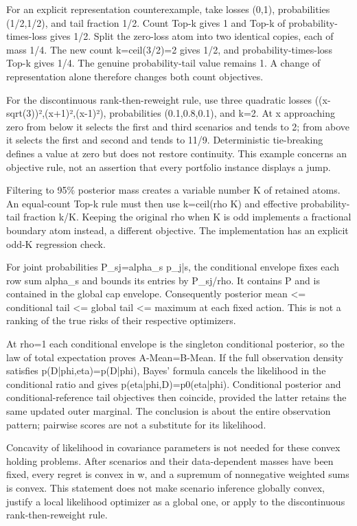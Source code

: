 \documentclass[10pt]{article}
\begin{document}
For an explicit representation counterexample, take losses (0,1), probabilities (1/2,1/2), and tail fraction 1/2. Count Top-k gives 1 and Top-k of probability-times-loss gives 1/2. Split the zero-loss atom into two identical copies, each of mass 1/4. The new count k=ceil(3/2)=2 gives 1/2, and probability-times-loss Top-k gives 1/4. The genuine probability-tail value remains 1. A change of representation alone therefore changes both count objectives.

For the discontinuous rank-then-reweight rule, use three quadratic losses ((x-sqrt(3))²,(x+1)²,(x-1)²), probabilities (0.1,0.8,0.1), and k=2. At x approaching zero from below it selects the first and third scenarios and tends to 2; from above it selects the first and second and tends to 11/9. Deterministic tie-breaking defines a value at zero but does not restore continuity. This example concerns an objective rule, not an assertion that every portfolio instance displays a jump.

Filtering to 95\% posterior mass creates a variable number K of retained atoms. An equal-count Top-k rule must then use k=ceil(rho K) and effective probability-tail fraction k/K. Keeping the original rho when K is odd implements a fractional boundary atom instead, a different objective. The implementation has an explicit odd-K regression check.

For joint probabilities P\_sj=alpha\_s p\_j|s, the conditional envelope fixes each row sum alpha\_s and bounds its entries by P\_sj/rho. It contains P and is contained in the global cap envelope. Consequently posterior mean <= conditional tail <= global tail <= maximum at each fixed action. This is not a ranking of the true risks of their respective optimizers.

At rho=1 each conditional envelope is the singleton conditional posterior, so the law of total expectation proves A-Mean=B-Mean. If the full observation density satisfies p(D|phi,eta)=p(D|phi), Bayes' formula cancels the likelihood in the conditional ratio and gives p(eta|phi,D)=p0(eta|phi). Conditional posterior and conditional-reference tail objectives then coincide, provided the latter retains the same updated outer marginal. The conclusion is about the entire observation pattern; pairwise scores are not a substitute for its likelihood.

Concavity of likelihood in covariance parameters is not needed for these convex holding problems. After scenarios and their data-dependent masses have been fixed, every regret is convex in w, and a supremum of nonnegative weighted sums is convex. This statement does not make scenario inference globally convex, justify a local likelihood optimizer as a global one, or apply to the discontinuous rank-then-reweight rule.
\end{document}
